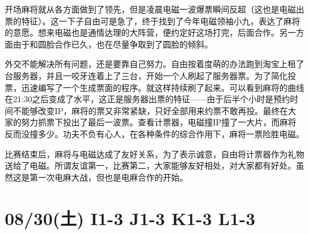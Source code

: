 开场麻将就从各方面做到了领先，但是凌晨电磁一波爆票瞬间反超（这也是电磁出票的特征）。这一下子自由可是急了，终于找到了今年电磁领袖小九，表达了麻将的意愿。想来电磁也是通情达理的大阵营，便约定好这场打完，后面合作。另一方面由于和圆脸合作已久，也在尽量争取到了圆脸的倾斜。

外交不能解决所有问题，还是要靠自己努力。自由按着度萌的办法跑到淘宝上租了台服务器，并且一咬牙连着上了三台，开始一个人刷起了服务器票。为了简化投票，迅速编写了一个生成票面的程序。就这样持续刷了起来。可以看到麻将的曲线在21:30之后变成了水平，这正是服务器出票的特征——由于后半个小时是预约时间不能够改变IP，麻将的票又非常紧缺，只好全部用来约票不敢再投。最终在大家的努力抓票下投出了最后一波票。查看计票器，电磁撞IP撞了一大片，而麻将反而没撞多少。功夫不负有心人，在各种条件的综合作用下，麻将一票险胜电磁。

比赛结束后，麻将与电磁达成了友好关系，为了表示诚意，自由将计票器作为礼物送给了电磁。所谓友谊第一，比赛第二，大家能够友好相处，对大家都有好处。虽然这是第一次电麻大战，但也是电麻合作的开始。

\section{08/30(土) I1-3 J1-3 K1-3 L1-3}


